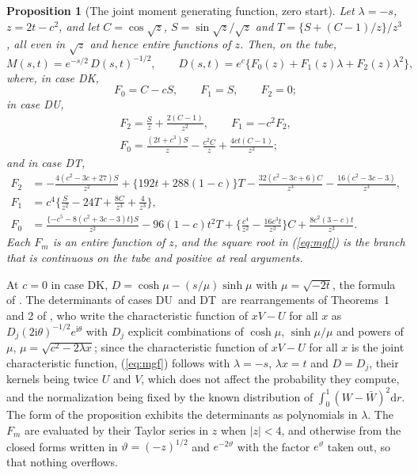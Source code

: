 \documentclass[ecta,nameyear,final]{econsocart}
\newcommand{\dr}[1]{{\mathrm d}#1}
\newcommand{\iu}{{\mathrm i}}
\newcommand{\Fk}{\textsf{\upshape DK}}
\newcommand{\Fu}{\textsf{\upshape DU}}
\newcommand{\Ft}{\textsf{\upshape DT}}
\theoremstyle{plain}
\newtheorem{proposition}{Proposition}
\theoremstyle{definition}
\begin{document}
\begin{proposition}[The joint moment generating function, zero start]
\label{prop:mgf}
Let $\lambda=-s$, $z=2t-c^2$, and let $C=\cos\sqrt z$, $S=\sin\sqrt z/\sqrt z$ and $T=\{S+(C-1)/z\}/z^3$, all even in $\sqrt z$ and hence entire functions of $z$.  Then, on the tube,
\begin{equation}
M(s,t)=e^{-s/2}\,D(s,t)^{-1/2},\qquad D(s,t)=e^c\{F_0(z)+F_1(z)\lambda+F_2(z)\lambda^2\},
\label{eq:mgf}
\end{equation}
where, in case \Fk,
\[
F_0=C-cS,\qquad F_1=S,\qquad F_2=0;
\]
in case \Fu,
\begin{gather*}
F_2=\frac{S}{z}+\frac{2(C-1)}{z^2},\qquad F_1=-c^2F_2,\\
F_0=\frac{(2t+c^3)S}{z}-\frac{c^2C}{z}+\frac{4ct(C-1)}{z^2};
\end{gather*}
and in case \Ft,
\begin{align*}
F_2&=-\frac{4(c^2-3c+27)S}{z^2}+\{192t+288(1-c)\}T-\frac{32(c^2-3c+6)C}{z^3}-\frac{16(c^2-3c-3)}{z^3},\\
F_1&=c^4\Big\{\frac{S}{z^2}-24T+\frac{8C}{z^3}+\frac{4}{z^3}\Big\},\\
F_0&=\frac{\{-c^5-8(c^2+3c-3)t\}S}{z^2}-96(1-c)t^2T+\Big\{\frac{c^4}{z^2}-\frac{16c^3t}{z^3}\Big\}C+\frac{8c^2(3-c)t}{z^3}.
\end{align*}
Each $F_m$ is an entire function of $z$, and the square root in (\ref{eq:mgf}) is the branch that is continuous on the tube and positive at real arguments.
\end{proposition}

At $c=0$ in case \Fk, $D=\cosh\mu-(s/\mu)\sinh\mu$ with $\mu=\sqrt{-2t}$, the formula of \cite{Phillips1987}.  The determinants of cases \Fu\ and \Ft\ are rearrangements of Theorems~1 and 2 of \cite{NabeyaSorensen1994}, who write the characteristic function of $xV-U$ for all $x$ as $D_j(2\iu\theta)^{-1/2}e^{\iu\theta}$ with $D_j$ explicit combinations of $\cosh\mu$, $\sinh\mu/\mu$ and powers of $\mu$, $\mu=\sqrt{c^2-2\lambda x}$; since the characteristic function of $xV-U$ for all $x$ is the joint characteristic function, (\ref{eq:mgf}) follows with $\lambda=-s$, $\lambda x=t$ and $D=D_j$, their kernels being twice $U$ and $V$, which does not affect the probability they compute, and the normalization being fixed by the known distribution of $\int_0^1(W-\bar W)^2\dr{r}$.  The form of the proposition exhibits the determinants as polynomials in $\lambda$.  The $F_m$ are evaluated by their Taylor series in $z$ when $|z|<4$, and otherwise from the closed forms written in $\vartheta=(-z)^{1/2}$ and $e^{-2\vartheta}$ with the factor $e^\vartheta$ taken out, so that nothing overflows.
\end{document}
